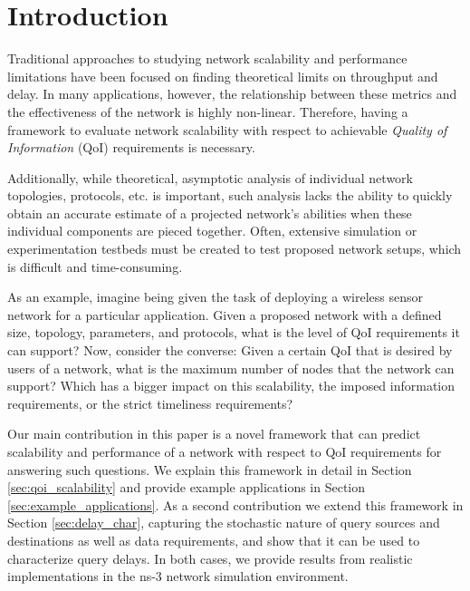 \section{Introduction}
\label{sec:intro}


Traditional approaches to studying network scalability and performance limitations have been focused on finding theoretical limits on throughput and delay.  In many applications, however, the relationship between these metrics and the effectiveness of the network is highly non-linear.  Therefore, having a framework to evaluate network scalability with respect to achievable \emph{Quality of Information} (QoI) requirements is necessary.

Additionally, while theoretical, asymptotic analysis of individual network topologies, protocols, etc. is important, such analysis lacks the ability to quickly obtain an accurate estimate of a projected network's abilities when these individual components are pieced together.  Often, extensive simulation or experimentation testbeds must be created to test proposed network setups, which is difficult and time-consuming.  

As an example, imagine being given the task of deploying a wireless sensor network for a particular application.  Given a proposed network with a defined size, topology, parameters, and protocols, what is the level of QoI requirements it can support?  Now, consider the converse:  Given a certain QoI that is desired by users of a network, what is the maximum number of nodes that the network can support?  Which has a bigger impact on this scalability, the imposed information requirements, or the strict timeliness requirements?

Our main contribution in this paper is a novel framework that can predict scalability and performance of a network with respect to QoI requirements for answering such questions.  We explain this framework in detail in Section \ref{sec:qoi_scalability} and provide example applications in Section \ref{sec:example_applications}.  As a second contribution we extend this framework in Section \ref{sec:delay_char}, capturing the stochastic nature of query sources and destinations as well as data requirements, and show that it can be used to characterize query delays.  In both cases, we provide results from realistic implementations in the ns-3 network simulation environment.  

